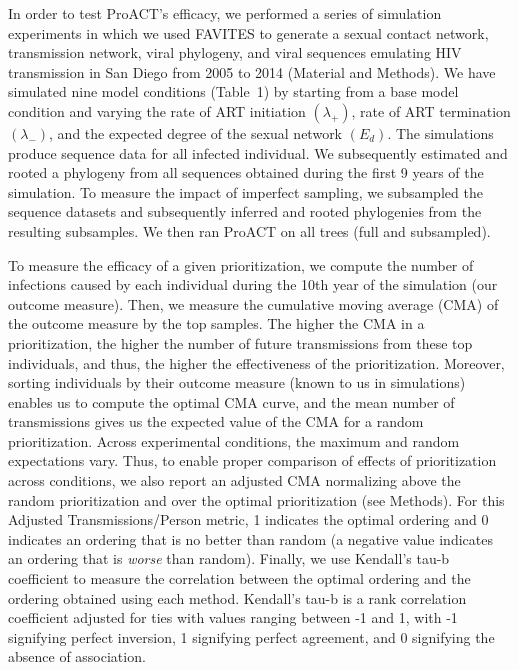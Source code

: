 \documentclass[a4paper,11pt]{article}
\newcommand{\PLWH}{sample\xspace}
\begin{document}
In order to test ProACT's efficacy, we performed a series of simulation experiments in which we used FAVITES \supercite{Moshiri2018} to generate a sexual contact network, transmission network, viral phylogeny, and viral sequences emulating HIV transmission in San Diego from 2005 to 2014 (Material and Methods).
We have simulated nine model conditions (Table~1) by starting from a base model condition and varying the rate of ART initiation $(\lambda_+)$, rate of ART termination $(\lambda_-)$, and the expected degree of the sexual network $(E_d)$.
The simulations produce sequence data for all infected individual. 
We subsequently estimated and rooted a phylogeny from all sequences obtained during the first 9 years of the simulation.
To measure the impact of imperfect sampling, we subsampled the sequence datasets and subsequently inferred and rooted phylogenies from the resulting subsamples.
We then ran ProACT on all trees (full and subsampled).

To measure the efficacy of a given prioritization,
we compute the number of infections caused by each individual during the 10th year of the simulation (our outcome measure).
Then, we measure the cumulative moving average (CMA) of the outcome measure by the top \PLWH{s}. 
The higher the CMA in a prioritization, the higher the number of future transmissions from these {top} individuals, and thus, the higher the effectiveness of the prioritization. 
Moreover, sorting individuals by their outcome measure (known to us in simulations) enables us to compute the optimal CMA curve, and the mean number of transmissions gives us the expected value of the CMA for a random prioritization.
Across experimental conditions, the maximum and random expectations vary.
Thus, to enable proper comparison of {effects of prioritization} across conditions,
we also report an adjusted CMA normalizing above the random prioritization and over the optimal prioritization (see Methods).
For this Adjusted Transmissions/Person metric, 1 indicates the optimal ordering and 0 indicates an ordering that is no better than random (a negative value indicates an ordering that is \textit{worse} than random). 
Finally, we use Kendall's tau-b coefficient to measure the correlation between the optimal ordering and the ordering obtained using each method. 
Kendall's tau-b is a rank correlation coefficient adjusted for ties with values ranging between -1 and 1, with -1 signifying perfect inversion, 1 signifying perfect agreement, and 0 signifying the absence of association.\supercite{Kendall1938}
\end{document}
